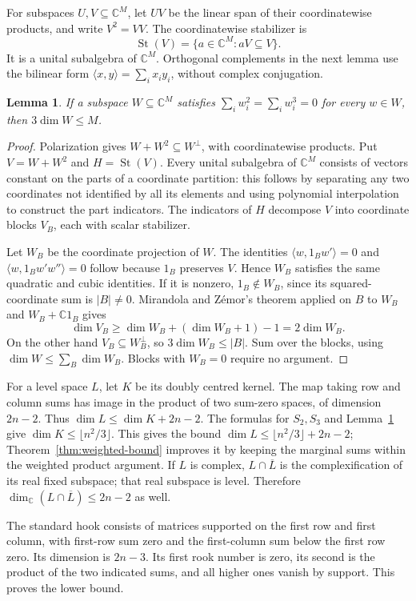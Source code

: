 \documentclass[11pt]{article}
\newcommand{\C}{\mathbb C}
\DeclareMathOperator{\St}{St}
\newtheorem{lemma}[theorem]{Lemma}
\theoremstyle{definition}
\theoremstyle{remark}
\begin{document}
For subspaces $U,V\subseteq\C^M$, let $UV$ be the linear span of their coordinatewise products, and write $V^2=VV$. The coordinatewise stabilizer is
\[
 \St(V)=\{a\in\C^M:aV\subseteq V\}.
\]
It is a unital subalgebra of $\C^M$. Orthogonal complements in the next lemma use the bilinear form $\langle x,y\rangle=\sum_i x_i y_i$, without complex conjugation.

\begin{lemma}\label{lem:fermat}
If a subspace $W\subseteq\C^M$ satisfies $\sum_iw_i^2=\sum_iw_i^3=0$ for every $w\in W$, then $3\dim W\leq M$.
\end{lemma}
\begin{proof}
Polarization gives $W+W^2\subseteq W^\perp$, with coordinatewise products. Put $V=W+W^2$ and $H=\St(V)$. Every unital subalgebra of $\C^M$ consists of vectors constant on the parts of a coordinate partition: this follows by separating any two coordinates not identified by all its elements and using polynomial interpolation to construct the part indicators. The indicators of $H$ decompose $V$ into coordinate blocks $V_B$, each with scalar stabilizer.

Let $W_B$ be the coordinate projection of $W$. The identities
$\langle w,1_Bw'\rangle=0$ and $\langle w,1_Bw'w''\rangle=0$ follow because $1_B$ preserves $V$. Hence $W_B$ satisfies the same quadratic and cubic identities. If it is nonzero, $1_B\notin W_B$, since its squared-coordinate sum is $|B|\ne0$. Mirandola and Z\'emor's theorem applied on $B$ to $W_B$ and $W_B+\C1_B$ gives
\[
 \dim V_B\geq\dim W_B+(\dim W_B+1)-1=2\dim W_B.
\]
On the other hand $V_B\subseteq W_B^\perp$, so $3\dim W_B\leq|B|$. Sum over the blocks, using $\dim W\leq\sum_B\dim W_B$. Blocks with $W_B=0$ require no argument.
\end{proof}

For a level space $L$, let $K$ be its doubly centred kernel. The map taking row and column sums has image in the product of two sum-zero spaces, of dimension $2n-2$. Thus
$\dim L\leq\dim K+2n-2$. The formulas for $S_2,S_3$ and Lemma~\ref{lem:fermat} give $\dim K\leq\lfloor n^2/3\rfloor$. This gives the bound $\dim L\leq\lfloor n^2/3\rfloor+2n-2$; Theorem~\ref{thm:weighted-bound} improves it by keeping the marginal sums within the weighted product argument.
If $L$ is complex, $L\cap\overline L$ is the complexification of its real fixed subspace; that real subspace is level. Therefore $\dim_\C(L\cap\overline L)\leq2n-2$ as well.

The standard hook consists of matrices supported on the first row and first column, with first-row sum zero and the first-column sum below the first row zero. Its dimension is $2n-3$. Its first rook number is zero, its second is the product of the two indicated sums, and all higher ones vanish by support. This proves the lower bound.
\end{document}
